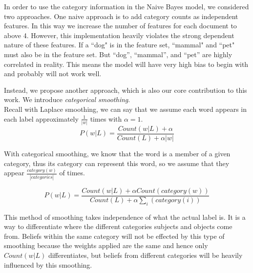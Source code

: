 
In order to use the category information in the Naive Bayes model, we considered two approaches. One naive approach is to add category counts as independent features. In this way we increase the number of features for each document to above 4. However, this implementation heavily violates the strong dependent nature of these features. If a ``dog" is in the feature set, ``mammal" and ``pet" must also be in the feature set. But ``dog'', ``mammal'', and ``pet'' are highly correlated in reality. This means the model will have very high bias to begin with and probably will not work well.

Instead, we propose another approach, which is also our core contribution to this work. We introduce \emph{categorical smoothing}.\\

Recall with Laplace smoothing, we can say that we assume each word appears in each label approximately $\frac{1}{|w|}$ times with $\alpha = 1$.\\

\begin{equation}
	P(w|L) = \frac{Count(w|L)+\alpha}{Count(L)+\alpha |w|}
\end{equation}

With categorical smoothing, we know that the word is a member of a given category, thus its category can represent this word, so we assume that they appear $\frac{category(w)}{|categories|}$ of times. 

\begin{equation}
	P(w|L) = \frac{Count(w|L)+\alpha Count(category(w))}{Count(L)+\alpha \sum_i(category(i))}
\end{equation}

This method of smoothing takes independence of what the actual label is. It is a way to differentiate  where the different categories subjects and objects come from. Beliefs within the same category will not be effected by this type of smoothing because the weights applied are the same and hence only $Count(w|L)$ differentiates, but beliefs from different categories will be heavily influenced by this smoothing.

